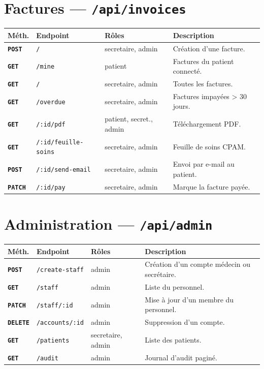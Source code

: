 \documentclass[12pt,a4paper]{report}
\newcommand{\method}[1]{\texttt{\textcolor{MedTealDark}{\bfseries#1}}}
\begin{document}
\section{Factures — \texttt{/api/invoices}}

\begin{center}
\small
\begin{tabular}{@{} l p{5cm} p{3.5cm} p{4cm} @{}}
  \toprule
  \textbf{Méth.} & \textbf{Endpoint} & \textbf{Rôles} & \textbf{Description} \\
  \midrule
  \method{POST}  & \texttt{/}                    & secretaire, admin & Création d'une facture. \\
  \method{GET}   & \texttt{/mine}                & patient           & Factures du patient connecté. \\
  \method{GET}   & \texttt{/}                    & secretaire, admin & Toutes les factures. \\
  \method{GET}   & \texttt{/overdue}             & secretaire, admin & Factures impayées > 30 jours. \\
  \method{GET}   & \texttt{/:id/pdf}             & patient, secret., admin & Téléchargement PDF. \\
  \method{GET}   & \texttt{/:id/feuille-soins}   & secretaire, admin & Feuille de soins CPAM. \\
  \method{POST}  & \texttt{/:id/send-email}      & secretaire, admin & Envoi par e-mail au patient. \\
  \method{PATCH} & \texttt{/:id/pay}             & secretaire, admin & Marque la facture payée. \\
  \bottomrule
\end{tabular}
\end{center}

\section{Administration — \texttt{/api/admin}}

\begin{center}
\small
\begin{tabular}{@{} l p{4.5cm} p{3.5cm} p{4.5cm} @{}}
  \toprule
  \textbf{Méth.} & \textbf{Endpoint} & \textbf{Rôles} & \textbf{Description} \\
  \midrule
  \method{POST}   & \texttt{/create-staff}  & admin             & Création d'un compte médecin ou secrétaire. \\
  \method{GET}    & \texttt{/staff}         & admin             & Liste du personnel. \\
  \method{PATCH}  & \texttt{/staff/:id}     & admin             & Mise à jour d'un membre du personnel. \\
  \method{DELETE} & \texttt{/accounts/:id}  & admin             & Suppression d'un compte. \\
  \method{GET}    & \texttt{/patients}      & secretaire, admin & Liste des patients. \\
  \method{GET}    & \texttt{/audit}         & admin             & Journal d'audit paginé. \\
  \bottomrule
\end{tabular}
\end{center}
\end{document}
